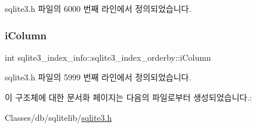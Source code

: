sqlite3.\+h 파일의 6000 번째 라인에서 정의되었습니다.

\mbox{\label{structsqlite3__index__info_1_1sqlite3__index__orderby_a266396085bfda9acef3f13eaa170cd2f}} 
\subsubsection{\texorpdfstring{i\+Column}{iColumn}}
{\footnotesize\ttfamily int sqlite3\+\_\+index\+\_\+info\+::sqlite3\+\_\+index\+\_\+orderby\+::i\+Column}



sqlite3.\+h 파일의 5999 번째 라인에서 정의되었습니다.



이 구조체에 대한 문서화 페이지는 다음의 파일로부터 생성되었습니다.\+:\begin{DoxyCompactItemize}
\item 
Classes/db/sqlitelib/\hyperlink{sqlite3_8h}{sqlite3.\+h}\end{DoxyCompactItemize}
